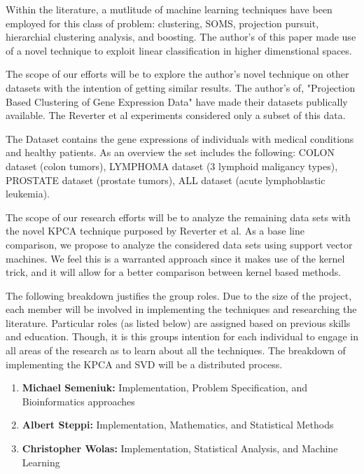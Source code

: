 \documentclass[10pt,a4,oneside]{report}
\begin{document}
Within the literature, a mutlitude of machine learning techniques have been employed for this class of problem: clustering, SOMS, projection pursuit, hierarchial clustering analysis, and boosting. The author's of this paper made use of a novel technique to exploit linear classification in higher dimenstional spaces.

The scope of our efforts will be to explore the author's novel technique on other datasets with the intention of getting similar results. The author's of, "Projection Based Clustering of Gene Expression Data" \cite{TasoulisPT09} have made their datasets publically available. The Reverter et al experiments considered only a subset of this data.

The Dataset contains the gene expressions of individuals with medical conditions and healthy patients. As an overview the set includes the following: COLON dataset (colon tumors), LYMPHOMA dataset (3 lymphoid maligancy types), PROSTATE dataset (prostate tumors), ALL dataset (acute lymphoblastic leukemia).

The scope of our research efforts will be to analyze the remaining data sets with the novel KPCA technique purposed by Reverter et al. As a base line comparison, we propose to analyze the considered data sets using support vector machines. We feel this is a warranted approach since it makes use of the kernel trick, and it will allow for a better comparison between kernel based methods.

The following breakdown justifies the group roles. Due to the size of the project, each member will be involved in implementing the techniques and researching the literature. Particular roles (as listed below) are assigned based on previous skills and education. Though, it is this groups intention for each individual to engage in all areas of the research as to learn about all the techniques. The breakdown of implementing the KPCA and SVD will be a distributed process.
\begin{enumerate}  \itemsep -2pt %
\item
{\bf Michael Semeniuk:} Implementation, Problem Specification, and Bioinformatics approaches
\item
{\bf Albert Steppi:} Implementation, Mathematics, and Statistical Methods
\item
{\bf Christopher Wolas:} Implementation, Statistical Analysis, and Machine Learning  
\end{enumerate}

\end{document}
